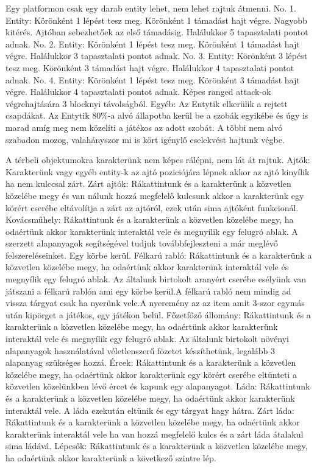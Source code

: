 
Egy platformon csak egy darab entity lehet, nem lehet rajtuk átmenni.
No. 1. Entity:
Körönként 1 lépést tesz meg.
Körönként 1 támadást hajt végre.
Nagyobb kitérés.
Ajtóban sebezhetőek az első támadásig.
Halálukkor 5 tapasztalati pontot adnak.
No. 2. Entity:
Körönként 1 lépést tesz meg.
Körönként 1 támadást hajt végre.
Halálukkor 3 tapasztalati pontot adnak.
No. 3. Entity:
Körönként 3 lépést tesz meg.
Körönként 3 támadást hajt végre.
Halálukkor 4 tapasztalati pontot adnak.
No. 4. Entity:
Körönként 1 lépést tesz meg.
Körönként 3 támadást hajt végre.
Halálukkor 4 tapasztalati pontot adnak.
Képes ranged attack-ok végrehajtására 3 blocknyi távolságból.
Egyéb:
Az Entytik elkerülik a rejtett csapdákat.
Az Entytik 80\%-a alvó állapotba kerül be a szobák egyikébe és úgy is marad amíg meg nem közelíti a játékos az adott szobát.
A többi nem alvó szabadon mozog, valahányszor mi is kört igénylő cselekvést hajtunk végbe.


A térbeli objektumokra karakterünk nem képes rálépni, nem lát át rajtuk.
Ajtók: Karakterünk vagy egyéb entity-k az ajtó poziciójára lépnek akkor az ajtó kinyílik ha nem kulccsal zárt.
Zárt ajtók: Rákattintunk és a karakterünk a közvetlen közelébe megy és van nálunk hozzá megfelelő kulcsunk akkor a karakterünk egy körért cserébe eltávolítja a zárt az ajtóról, ezek után sima ajtóként funkcionál.
Kovácsműhely: Rákattintunk és a karakterünk a közvetlen közelébe megy, ha odaértünk akkor karakterünk interaktál vele és megnyílik egy felugró ablak. A szerzett alapanyagok segítségével tudjuk továbbfejleszteni a már meglévő felszereléseinket. Egy körbe kerül.
Félkarú rabló: Rákattintunk és a karakterünk a közvetlen közelébe megy, ha odaértünk akkor karakterünk interaktál vele és megnyílik egy felugró ablak. Az általunk birtokolt aranyért cserébe esélyünk van játszani a félkarú rablón ami egy körbe kerül.A félkarú rabló nem mindig ad vissza tárgyat csak ha nyerünk vele.A nyeremény az az item amit 3-szor egymás után kipörget a játékos, egy játékon belül.
Főzetfőző állomány: Rákattintunk és a karakterünk a közvetlen közelébe megy, ha odaértünk akkor karakterünk interaktál vele és megnyílik egy felugró ablak. Az általunk birtokolt növényi alapanyagok használatával véletlenszerű fözetet készíthetünk, legalább 3 alapanyag szükséges hozzá.
Ércek: Rákattintunk és a karakterünk a közvetlen közelébe megy, ha odaértünk akkor karakterünk egy körért cserébe eltünteti a közvetlen közelünkben lévő ércet és kapunk egy alapanyagot.
Láda: Rákattintunk és a karakterünk a közvetlen közelébe megy, ha odaértünk akkor karakterünk interaktál vele. A láda ezekután eltünik és egy tárgyat hagy hátra.
Zárt láda: Rákattintunk és a karakterünk a közvetlen közelébe megy, ha odaértünk akkor karakterünk interaktál vele ha van hozzá megfelelő kulcs és a zárt láda átalakul sima ládává.
Lépcsők: Rákattintunk és a karakterünk a közvetlen közelébe megy, ha odaértünk akkor karakterünk a következő szintre lép.

